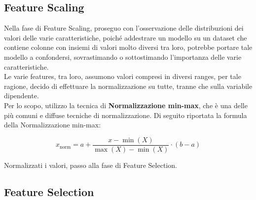 \documentclass[]{article}
\begin{document}
    \subsection{Feature Scaling}
        Nella fase di Feature Scaling, proseguo con l'osservazione delle distribuzioni dei valori delle varie caratteristiche, poiché addestrare un modello su un dataset che contiene colonne con insiemi di valori molto diversi tra loro, potrebbe portare tale modello a confondersi, sovrastimando o sottostimando l'importanza delle varie caratteristiche.\\
        Le varie features, tra loro, assumono valori compresi in diversi ranges, per tale ragione, decido di effettuare la normalizzazione su tutte, tranne che sulla variabile dipendente.\\
        Per lo scopo, utilizzo la tecnica di \textbf{Normalizzazione min-max}, che è una delle più comuni e diffuse tecniche di normalizzazione.
        Di seguito riportata la formula della Normalizzazione min-max:
        \begin{center}
            \[
                x_{\text{norm}} = a + \frac{{x - \min(X)}}{{\max(X) - \min(X)}} \cdot (b - a)
            \]
        \end{center}
        Normalizzati i valori, passo alla fase di Feature Selection.
    \subsection{Feature Selection}
\end{document}
